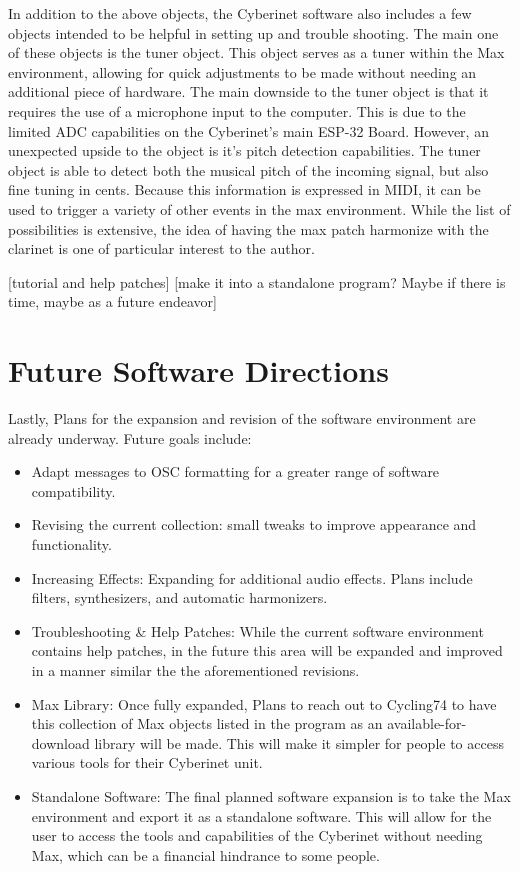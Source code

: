 In addition to the above objects, the Cyberinet software also includes a few objects intended to be helpful in setting up and trouble shooting. The main one of these objects is the tuner object. This object serves as a tuner within the Max environment, allowing for quick adjustments to be made without needing an additional piece of hardware. 
The main downside to the tuner object is that it requires the use of a microphone input to the computer. This is due to the limited ADC capabilities on the Cyberinet's main ESP-32 Board. However, an unexpected upside to the object is it's pitch detection capabilities. The tuner object is able to detect both the musical pitch of the incoming signal, but also fine tuning in cents. Because this information is expressed in MIDI, it can be used to trigger a variety of other events in the max environment. While the list of possibilities is extensive, the idea of having the max patch harmonize with the clarinet is one of particular interest to the author.

[tutorial and help patches]
[make it into a standalone program? Maybe if there is time, maybe as a future endeavor]


\section{Future Software Directions}
Lastly, Plans for the expansion and revision of the software environment are already underway. Future goals include:
\begin{itemize}
    \item Adapt messages to OSC formatting for a greater range of software compatibility.
    \item Revising the current collection: small tweaks to improve appearance and functionality.
    \item Increasing Effects: Expanding for additional audio effects. Plans include filters, synthesizers, and automatic harmonizers.
    \item Troubleshooting \& Help Patches: While the current software environment contains help patches, in the future this area will be expanded and improved in a manner similar the the aforementioned revisions.
    \item Max Library: Once fully expanded, Plans to reach out to Cycling74 to have this collection of Max objects listed in the program as an available-for-download library will be made. This will make it simpler for people to access various tools for their Cyberinet unit.
    \item Standalone Software: The final planned software expansion is to take the Max environment and export it as a standalone software. This will allow for the user to access the tools and capabilities of the Cyberinet without needing Max, which can be a financial hindrance to some people.
\end{itemize}

